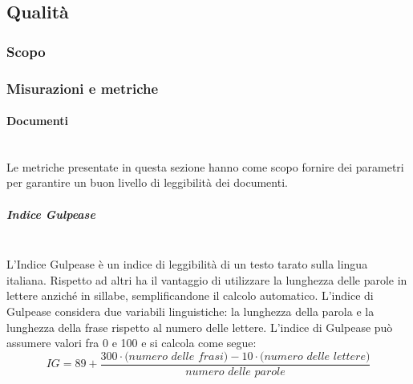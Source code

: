 \subsection{Qualità}
\subsubsection{Scopo}
\subsubsection{Misurazioni e metriche}
\paragraph{Documenti}\mbox{}\\
Le metriche presentate in questa sezione hanno come scopo fornire dei parametri per garantire un buon livello di leggibilità dei documenti.

\subparagraph{Indice Gulpease}\mbox{}\\
L'Indice Gulpease è un indice di leggibilità di un testo tarato sulla lingua italiana. Rispetto ad altri ha il vantaggio di utilizzare la lunghezza delle parole in lettere anziché in sillabe, semplificandone il calcolo automatico.
L'indice di Gulpease considera due variabili linguistiche: la lunghezza della parola e la lunghezza della frase rispetto al numero delle lettere.
L'indice di Gulpease può assumere valori fra 0 e 100 e si calcola come segue:
\[
IG = 89 + \frac{300 \cdot \textit{(numero delle frasi)} - 10 \cdot \textit{(numero delle lettere)}}{\textit{numero delle parole}}
\]

